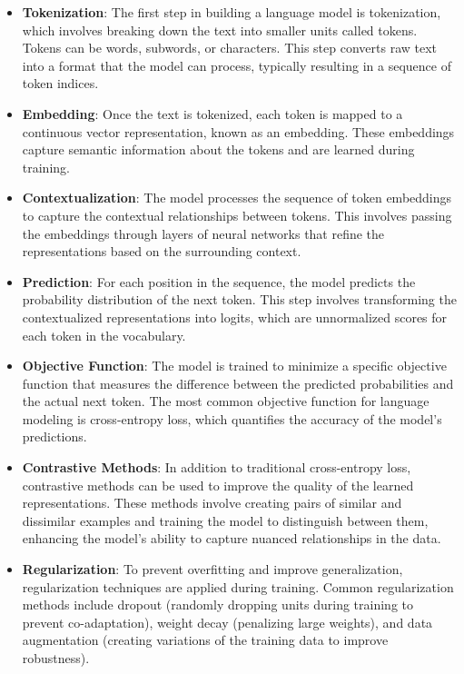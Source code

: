 \begin{itemize}
    \item \textbf{Tokenization}: The first step in building a language model is tokenization, which involves breaking down the text into smaller units called tokens. Tokens can be words, subwords, or characters. This step converts raw text into a format that the model can process, typically resulting in a sequence of token indices.

    \item \textbf{Embedding}: Once the text is tokenized, each token is mapped to a continuous vector representation, known as an embedding. These embeddings capture semantic information about the tokens and are learned during training.

    \item \textbf{Contextualization}: The model processes the sequence of token embeddings to capture the contextual relationships between tokens. This involves passing the embeddings through layers of neural networks that refine the representations based on the surrounding context.

    \item \textbf{Prediction}: For each position in the sequence, the model predicts the probability distribution of the next token. This step involves transforming the contextualized representations into logits, which are unnormalized scores for each token in the vocabulary.

    \item \textbf{Objective Function}: The model is trained to minimize a specific objective function that measures the difference between the predicted probabilities and the actual next token. The most common objective function for language modeling is cross-entropy loss, which quantifies the accuracy of the model's predictions.

    \item \textbf{Contrastive Methods}: In addition to traditional cross-entropy loss, contrastive methods can be used to improve the quality of the learned representations. These methods involve creating pairs of similar and dissimilar examples and training the model to distinguish between them, enhancing the model's ability to capture nuanced relationships in the data.

    \item \textbf{Regularization}: To prevent overfitting and improve generalization, regularization techniques are applied during training. Common regularization methods include dropout (randomly dropping units during training to prevent co-adaptation), weight decay (penalizing large weights), and data augmentation (creating variations of the training data to improve robustness).
\end{itemize}

